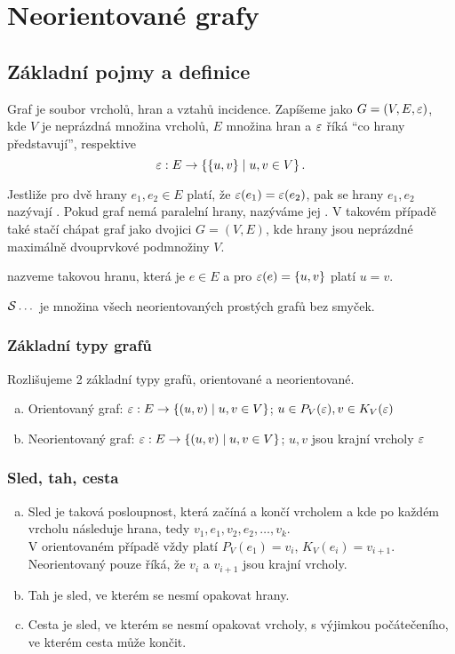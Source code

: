 \section{Neorientované grafy}

\subsection{Základní pojmy a definice}
Graf je soubor vrcholů, hran a vztahů incidence. Zapíšeme jako $G = (V, E, \eps)$, kde $V$ je neprázdná množina vrcholů, 
$E$ množina hran a $\eps$ říká \enquote{co hrany představují}, respektive
\begin{equation}
    \eps: E \rightarrow \bc{\bc{u, v} \mid u, v \in V}.
\end{equation}

Jestliže pro dvě hrany $e_1, e_2 \in E$ platí, že $\eps(e_1) = \eps(e_2)$, pak se hrany $e_1, e_2$ nazývají 
. Pokud graf nemá paralelní hrany, nazýváme jej . V takovém případě také stačí chápat graf jako 
dvojici $G = (V,E)$, kde hrany jsou neprázdné maximálně dvouprvkové podmnožiny $V$.\label{prosty}

 nazveme takovou hranu, která je $e \in E$ a pro $\eps(e) = \bc{u,v}$ platí $u=v$. \label{smycka}

$\S \dots$ je množina všech neorientovaných prostých grafů bez smyček.

\subsubsection{Základní typy grafů}
Rozlišujeme 2 základní typy grafů, orientované a neorientované.
\begin{enumerate}[(a)]
    \item Orientovaný graf: $\eps: E \rightarrow \bc{(u,v) \mid u,v \in V}$; $u \in P_V(\eps), v \in K_V(\eps)$
    \item Neorientovaný graf: $\eps: E \rightarrow \bc{(u,v) \mid u,v \in V}$; $u,v$ jsou krajní vrcholy $\eps$
\end{enumerate}

\subsubsection{Sled, tah, cesta}\label{stc}
\begin{enumerate}[(a)]
    \item Sled je taková posloupnost, která začíná a končí vrcholem a kde po každém vrcholu následuje 
    hrana, tedy $v_1, e_1, v_2, e_2, \dots, v_k$.\\
    V orientovaném případě vždy platí $P_V(e_1) = v_i$, $K_V(e_i)=v_{i+1}$. Neorientovaný pouze říká, že $v_i$ a 
    $v_{i+1}$ jsou krajní vrcholy.
    \item Tah je sled, ve kterém se nesmí opakovat hrany.
    \item Cesta je sled, ve kterém se nesmí opakovat vrcholy, s výjimkou počátečeního, ve kterém cesta 
    může končit.
\end{enumerate}

